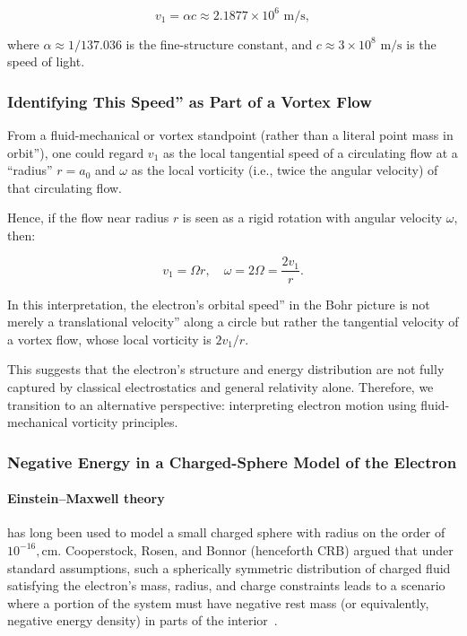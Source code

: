 \begin{equation*}
v_1 = \alpha c \approx 2.1877 \times 10^6 \text{ m/s},\label{eq:tangential-velocity}
\end{equation*}

where $\alpha \approx 1/137.036$ is the fine-structure constant, and $c \approx 3 \times 10^8 \text{ m/s}$ is the speed of light.

\subsubsection*{Identifying This Speed'' as Part of a Vortex Flow}
From a fluid-mechanical or vortex standpoint (rather than a literal point mass in orbit''), one could regard $v_1$ as the local tangential speed of a circulating flow at a ``radius'' $r = a_0$ and $\omega$ as the local vorticity (i.e., twice the angular velocity) of that circulating flow.

Hence, if the flow near radius $r$ is seen as a rigid rotation with angular velocity $\omega$, then:

\begin{equation*}
v_1 = \Omega r, \quad \omega = 2\Omega = \frac{2v_1}{r}.\label{eq:angular-velocity}
\end{equation*}

In this interpretation, the electron’s orbital speed'' in the Bohr picture is not merely a translational velocity'' along a circle but rather the tangential velocity of a vortex flow, whose local vorticity is $2 v_1 / r$.

This suggests that the electron's structure and energy distribution are not fully captured by classical electrostatics and general relativity alone. Therefore, we transition to an alternative perspective: interpreting electron motion using fluid-mechanical vorticity principles.

\subsubsection*{Negative Energy in a Charged-Sphere Model of the Electron}

\paragraph{Einstein--Maxwell theory} has long been used to model a small charged sphere with radius on the order of $10^{-16},\mathrm{cm}$. Cooperstock, Rosen, and Bonnor (henceforth CRB) argued that under standard assumptions, such a spherically symmetric distribution of charged fluid satisfying the electron's mass, radius, and charge constraints leads to a scenario where a portion of the system must have negative rest mass (or equivalently, negative energy density) in parts of the interior~\cite{CRB1970}.

